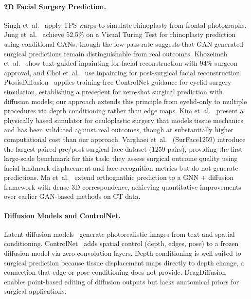 \documentclass[runningheads]{llncs}
\begin{document}
\paragraph{2D Facial Surgery Prediction.}
Singh et~al.~\cite{singh2022rhinoplasty} apply TPS warps to simulate
rhinoplasty from frontal photographs.
Jung et~al.~\cite{jung2024rhinoplastygan} achieve 52.5\% on a Visual
Turing Test for rhinoplasty prediction using conditional GANs, though
the low pass rate suggests that GAN-generated surgical predictions remain
distinguishable from real outcomes.
Khozeimeh et~al.~\cite{khozeimeh2025medicina} show text-guided
inpainting for facial reconstruction with 94\% surgeon approval, and
Choi et~al.~\cite{choi2025mdpi} use inpainting for post-surgical facial
reconstruction.
PtosisDiffusion~\cite{ptosisdiffusion2024} applies training-free ControlNet
guidance for eyelid surgery simulation, establishing a precedent for
zero-shot surgical prediction with diffusion models; our approach extends
this principle from eyelid-only to multiple procedures via depth
conditioning rather than edge maps.
Kim et~al.~\cite{kim2025oculoplastic} present a physically based simulator
for oculoplastic surgery that models tissue mechanics and has been validated
against real outcomes, though at substantially higher computational cost
than our approach.
Varghaei et~al.~\cite{varghaei2025surface1259} (SurFace1259) introduce the
largest paired pre/post-surgical face dataset (1259 pairs), providing the
first large-scale benchmark for this task; they assess surgical outcome
quality using facial landmark displacement and face recognition metrics
but do not generate predictions.
Ma et~al.~\cite{ma2025gposc} extend orthognathic prediction to a GNN +
diffusion framework with dense 3D correspondence, achieving quantitative
improvements over earlier GAN-based methods on CT data.

\paragraph{Diffusion Models and ControlNet.}
Latent diffusion models~\cite{rombach2022latent} generate photorealistic
images from text and spatial conditioning. ControlNet~\cite{zhang2023controlnet}
adds spatial control (depth, edges, pose) to a frozen diffusion model via
zero-convolution layers. Depth conditioning is well suited to surgical
prediction because tissue displacement maps directly to depth change, a
connection that edge or pose conditioning does not provide.
DragDiffusion~\cite{shi2024dragdiffusion} enables point-based editing of
diffusion outputs but lacks anatomical priors for surgical applications.
\end{document}
